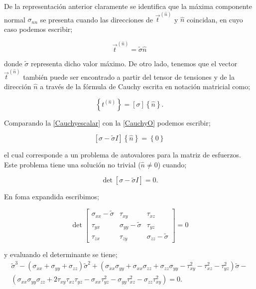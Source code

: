 \documentclass[../notas medios.tex]{subfiles}
\begin{document}
De la representación anterior claramente se identifica que la máxima componente normal ${\sigma _{nn}}$ se presenta cuando las direcciones de ${\vec t^{(\hat n)}}$ y $\hat{n}$ coincidan, en cuyo caso podemos escribir;

\begin{equation}
{{\vec t}^{(\hat n)}} = \tilde \sigma \hat n
\label{Cauchyescalar}
\end{equation}

donde ${\tilde \sigma }$ representa dicho valor máximo. De otro lado, tenemos que el vector ${\vec t^{(\hat n)}}$ también puede ser encontrado a partir del tensor de tensiones y de la dirección $\hat{n}$ a través de la fórmula de Cauchy escrita en notación matricial como;

\begin{equation}
\left\{ {{t^{(\hat n)}}} \right\} = \left[ \sigma  \right]\left\{ {\hat n} \right\}.
\label{CauchyO}
\end{equation}

Comparando la \cref{Cauchyescalar} con la \cref{CauchyO} podemos escribir;

\begin{equation}
\left[ {\sigma  - \tilde \sigma I} \right]\left\{ {\hat n} \right\} = \left\{ 0 \right\}
\label{eigen}
\end{equation}

el cual corresponde a un problema de autovalores para la matriz de esfuerzos. Este problema tiene una solución no trivial ($\hat{n}\neq 0$) cuando;

\[\det \left[ {\sigma  - \tilde \sigma I} \right] = 0.\]

En foma expandida escribimos;

\[\det \left[ {\begin{array}{*{20}{c}}
{{\sigma _{xx}} - \tilde \sigma }&{{\tau _{xy}}}&{{\tau _{xz}}}\\
{{\tau _{yx}}}&{{\sigma _{yy}} - \tilde \sigma }&{{\tau _{yz}}}\\
{{\tau _{zx}}}&{{\tau _{zy}}}&{{\sigma _{zz}} - \tilde \sigma }
\end{array}} \right] = 0\]

y evaluando el determinante se tiene;
\begin{align}
{{\tilde \sigma }^3} - ({\sigma _{xx}} + {\sigma _{yy}} + {\sigma _{zz}}){{\tilde \sigma }^2} + ({\sigma _{xx}}{\sigma _{yy}} + {\sigma _{xx}}{\sigma _{zz}} + {\sigma _{zz}}{\sigma _{yy}} - \tau _{xy}^2 - \tau _{xz}^2 - \tau _{yz}^2)\tilde \sigma  - \nonumber \\
 ({\sigma _{xx}}{\sigma _{yy}}{\sigma _{zz}} + 2{\tau _{xy}}{\tau _{xz}}{\tau _{yz}} - {\sigma _{xx}}\tau _{yz}^2 - {\sigma _{yy}}\tau _{xz}^2 - {\sigma _{zz}}\tau _{xy}^2) = 0.
\label{caracteristica}
\end{align}
\end{document}
